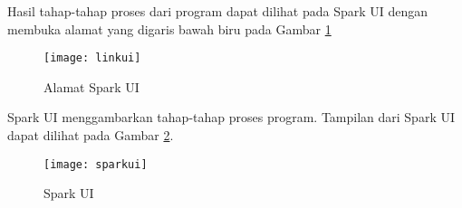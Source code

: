 \begin{enumerate}
Hasil tahap-tahap proses dari program dapat dilihat pada Spark UI dengan membuka alamat yang digaris bawah biru pada Gambar \ref{fig:linkui}

\begin{figure}[H]
    \centering  
    \texttt{[image: linkui]}  
    \caption[Alamat Spark UI]{Alamat Spark UI} 
    \label{fig:linkui} 
\end{figure}

Spark UI menggambarkan tahap-tahap proses program. Tampilan dari Spark UI dapat dilihat pada Gambar \ref{fig:sparkui}.
\begin{figure}[H]
    \centering  
    \texttt{[image: sparkui]}  
    \caption[Spark UI]{Spark UI} 
    \label{fig:sparkui} 
\end{figure}





 
\end{enumerate}
